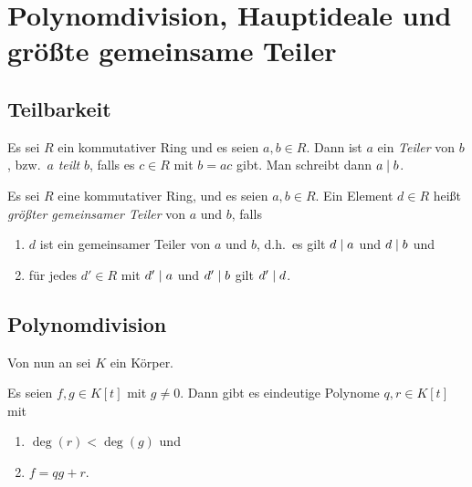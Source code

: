 \section{Polynomdivision, Hauptideale und größte gemeinsame Teiler}





\subsection{Teilbarkeit}

\begin{definition}
  Es sei $R$ ein kommutativer Ring und es seien $a, b \in R$.
  Dann ist $a$ ein \emph{Teiler} von $b$, bzw.\ $a$ \emph{teilt} $b$, falls es $c \in R$ mit $b = ac$ gibt.
  Man schreibt dann $a \mathrel{|} b$.
\end{definition}

\begin{definition}
  Es sei $R$ eine kommutativer Ring, und es seien $a, b \in R$.
  Ein Element $d \in R$ heißt \emph{größter gemeinsamer Teiler} von $a$ und $b$, falls
  \begin{enumerate}
    \item
      $d$ ist ein gemeinsamer Teiler von $a$ und $b$, d.h.\ es gilt $d \mathrel{|} a$ und $d \mathrel{|} b$ und
    \item
      für jedes $d' \in R$ mit $d' \mathrel{|} a$ und $d' \mathrel{|} b$ gilt $d' \mathrel{|} d$.
  \end{enumerate}
\end{definition}





\subsection{Polynomdivision}

Von nun an sei $K$ ein Körper.

\begin{theorem}
  \label{theorem: polynomial division}
  Es seien $f, g \in K[t]$ mit $g \neq 0$.
  Dann gibt es eindeutige Polynome $q, r \in K[t]$ mit
  \begin{enumerate}
    \item
      $\deg(r) < \deg(g)$ und
    \item
      $f = qg + r$.
  \end{enumerate}
\end{theorem}

